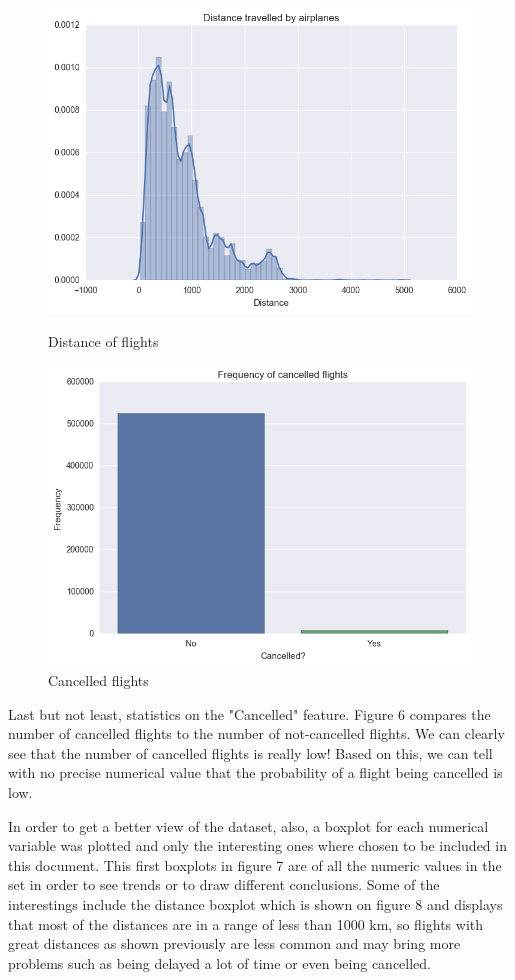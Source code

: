 \documentclass{article}
\begin{document}
    \begin{figure}[H]
      \includegraphics[width=\linewidth]{graph/dist_flights.png}
      \caption{Distance of flights}
      \label{fig:graph1}
      \includegraphics[width=\linewidth]{graph/cancelled_flights.png}
      \caption{Cancelled flights}
      \label{fig:graph1}
    \end{figure}
    
    Last but not least, statistics on the "Cancelled" feature. Figure 6 compares the number of cancelled flights to the number of not-cancelled flights. We can clearly see that the number of cancelled flights is really low! Based on this, we can tell with no
    precise numerical value that the probability of a flight being cancelled is low.

    In order to get a better view of the dataset, also, a boxplot for each numerical variable was plotted and only the interesting ones where chosen to be included in this document. This first boxplots in figure 7 are of all the numeric values in the set in order to see trends or to draw different conclusions. Some of the interestings include the distance boxplot which is shown on figure 8 and displays that most of the distances are in a range of less than 1000 km, so flights with great distances as shown previously are less common and may bring more problems such as being delayed a lot of time or even being cancelled. 
\end{document}
